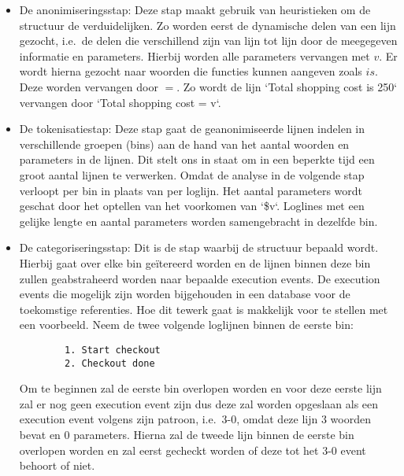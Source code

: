 \begin{itemize}
    \item De anonimiseringsstap: Deze stap maakt gebruik van heuristieken om de structuur de verduidelijken. Zo worden eerst de dynamische delen van een lijn gezocht, i.e.\ de delen die verschillend zijn van lijn tot lijn door de meegegeven informatie en parameters. Hierbij worden alle parameters vervangen met $v$. Er wordt hierna gezocht naar woorden die functies kunnen aangeven zoals $is$. Deze worden vervangen door $=$. Zo wordt de lijn `Total shopping cost is 250` vervangen door `Total shopping cost = v`.\\
    
    \item De tokenisatiestap: Deze stap gaat de geanonimiseerde lijnen indelen in verschillende groepen (bins) aan de hand  van het aantal woorden en parameters in de lijnen. Dit stelt ons in staat om in een beperkte tijd een groot aantal lijnen te verwerken. Omdat de analyse in de volgende stap verloopt per bin in plaats van per loglijn. Het aantal parameters wordt geschat door het optellen van het voorkomen van `\$v`. Loglines met een gelijke lengte en aantal parameters worden samengebracht in dezelfde bin.\\
    
    \item De categoriseringsstap: Dit is de stap waarbij de structuur bepaald wordt. Hierbij gaat over elke bin geïtereerd worden en de lijnen binnen deze bin zullen geabstraheerd worden naar bepaalde execution events. De execution events die mogelijk zijn worden bijgehouden in een database voor de toekomstige referenties. Hoe dit tewerk gaat is makkelijk voor te stellen met een voorbeeld. Neem de twee volgende loglijnen binnen de eerste bin:
    \begin{verbatim}
        1. Start checkout
        2. Checkout done
    \end{verbatim}
    Om te beginnen zal de eerste bin overlopen worden en voor deze eerste lijn zal er nog geen execution event zijn dus deze zal worden opgeslaan als een execution event volgens zijn patroon, i.e.\ 3-0, omdat deze lijn 3 woorden bevat en 0 parameters. Hierna zal de tweede lijn binnen de eerste bin overlopen worden en zal eerst gecheckt worden of deze tot het 3-0 event behoort of niet.\\
    

\end{itemize}
